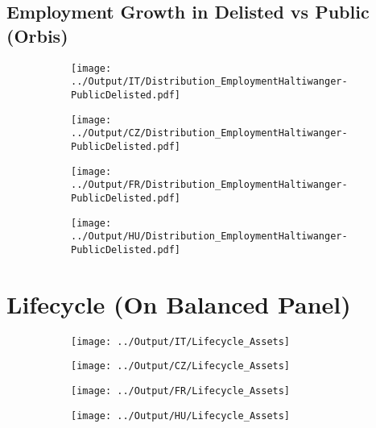 \documentclass[12pt,notitlepage]{article}
\begin{document}
\subsection{Employment Growth in Delisted vs Public (Orbis)}
\begin{figure}[!htpb]
\centering
\begin{subfigure}{.49\textwidth}
    \centering
 \texttt{[image: ../Output/IT/Distribution\_EmploymentHaltiwanger-PublicDelisted.pdf]}
\end{subfigure}%
\begin{subfigure}{.49\textwidth}
    \centering
 \texttt{[image: ../Output/CZ/Distribution\_EmploymentHaltiwanger-PublicDelisted.pdf]}
\end{subfigure}
\begin{subfigure}{.49\textwidth}
    \centering
 \texttt{[image: ../Output/FR/Distribution\_EmploymentHaltiwanger-PublicDelisted.pdf]}
\end{subfigure}%
\begin{subfigure}{.49\textwidth}
    \centering
 \texttt{[image: ../Output/HU/Distribution\_EmploymentHaltiwanger-PublicDelisted.pdf]}
\end{subfigure}
\end{figure}
\pagebreak



\FloatBarrier
\section{Lifecycle (On Balanced Panel)} %
\label{sec:lifecycle}
\FloatBarrier




\begin{figure}[!htpb]
\centering
\caption{Firm age and Assets}
\begin{subfigure}{.49\textwidth}
    \centering
 \texttt{[image: ../Output/IT/Lifecycle\_Assets]}
\end{subfigure}%
\begin{subfigure}{.49\textwidth}
    \centering
 \texttt{[image: ../Output/CZ/Lifecycle\_Assets]}
\end{subfigure}
\begin{subfigure}{.49\textwidth}
    \centering
 \texttt{[image: ../Output/FR/Lifecycle\_Assets]}
\end{subfigure}%
\begin{subfigure}{.49\textwidth}
    \centering
 \texttt{[image: ../Output/HU/Lifecycle\_Assets]}
\end{subfigure}
\end{figure}
\pagebreak
\end{document}
